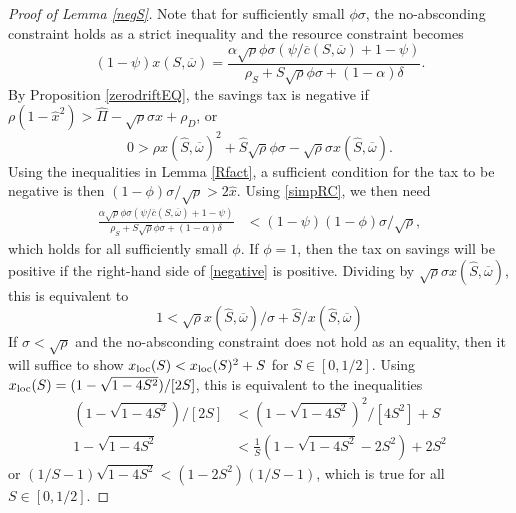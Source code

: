 \documentclass[11pt]{article}
\theoremstyle{plain}
\theoremstyle{definition} %
\begin{document}

\begin{proof}[Proof of Lemma \ref{negS}]
Note that for sufficiently small $\phi\sigma$, the no-absconding constraint holds as a strict inequality and the resource constraint becomes
\begin{equation}
(1-\psi)x(S, \overline{\omega}) = \frac{\alpha \sqrt{\rho}\phi \sigma(\psi/\overline{c}(S, \overline{\omega}) + 1-\psi)}{\rho_S + S\sqrt{\rho}\phi \sigma + (1-\alpha)\delta}.
\label{simpRC}
\end{equation} %
By Proposition \ref{zerodriftEQ}, the savings tax is negative if $\rho(1-\hat{x}^2) > \hat{\Pi} - \sqrt{\rho} \sigma \hat{x} + \rho_D$, or 
\begin{equation}
0 > \rho x(\hat{S},\overline{\omega})^2 + \hat{S}\sqrt{\rho}\phi \sigma - \sqrt{\rho} \sigma x(\hat{S},\overline{\omega}).
\label{negative}
\end{equation} %
Using the inequalities in Lemma \ref{Rfact}, a sufficient condition for the tax to be negative is then $(1-\phi) \sigma/\sqrt{\rho} > 2\hat{x}$. Using \eqref{simpRC}, we then need
\begin{align*}
\frac{\alpha \sqrt{\rho}\phi \sigma(\psi/\overline{c}(S, \overline{\omega}) + 1-\psi)}{\rho_S + S\sqrt{\rho}\phi \sigma + (1-\alpha)\delta} & < (1-\psi)(1-\phi) \sigma/\sqrt{\rho},
\end{align*}
which holds for all sufficiently small $\phi$. If $\phi=1$, then the tax on savings will be positive if the right-hand side of \eqref{negative} is positive. Dividing by $\sqrt{\rho} \sigma x(\hat{S},\overline{\omega})$, this is equivalent to
\begin{equation}
1 < \sqrt{\rho} x(\hat{S},\overline{\omega})/\sigma + \hat{S}/x(\hat{S},\overline{\omega})
\label{smallsig}
\end{equation}
If $\sigma < \sqrt{\rho}$ and the no-absconding constraint does not hold as an equality, then it will suffice to show $x_{\textnormal{loc}}(S) < x_{\textnormal{loc}}(S)^2 + S$ for $S \in [0,1/2]$. Using $x_{\textnormal{loc}}(S) = (1 - \sqrt{1-4S^2})/[2S]$, this is equivalent to the inequalities
\begin{align*}
(1 - \sqrt{1-4S^2})/[2S] & < (1 - \sqrt{1-4S^2})^2/[4S^2] + S
\\ 1 - \sqrt{1-4S^2} & < \frac{1}{S}(1 - \sqrt{1-4S^2} - 2S^2) + 2S^2
\end{align*}
or $(1/S-1)\sqrt{1-4S^2} < (1 - 2S^2)(1/S - 1)$, which is true for all $S\in [0,1/2]$.
\end{proof} 
\end{document}
